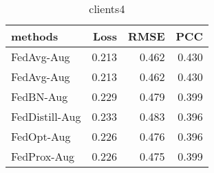 \begin{table}
\caption{clients4}
\begin{tabular}{lrrr}
\toprule
methods & Loss & RMSE & PCC \\
\midrule
FedAvg-Aug & 0.213 & 0.462 & 0.430 \\
FedAvg-Aug & 0.213 & 0.462 & 0.430 \\
FedBN-Aug & 0.229 & 0.479 & 0.399 \\
FedDistill-Aug & 0.233 & 0.483 & 0.396 \\
FedOpt-Aug & 0.226 & 0.476 & 0.396 \\
FedProx-Aug & 0.226 & 0.475 & 0.399 \\
\bottomrule
\end{tabular}
\end{table}
